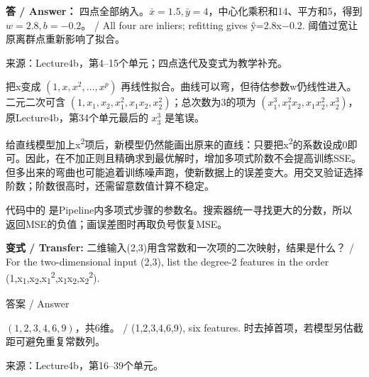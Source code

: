 \textbf{答 / Answer：} 四点全部纳入。\(\bar x=1.5,\bar y=4\)，中心化乘积和14、平方和5，得到\(w=2.8,b=-0.2\)。 / All four are inliers; refitting gives ŷ=2.8x\ensuremath{-}0.2. 阈值过宽让原离群点重新影响了拟合。


来源：Lecture4b，第4–15个单元；四点迭代及变式为教学补充。





把x变成 \((1,x,x^2,\ldots,x^p)\) 再线性拟合。曲线可以弯，但待估参数w仍线性进入。二元二次可含 \((1,x_1,x_2,x_1^2,x_1x_2,x_2^2)\)；总次数为3的项为 \((x_1^3,x_1^2x_2,x_1x_2^2,x_2^3)\)，原Lecture4b，第34个单元最后的 \(x_3^3\) 是笔误。


给直线模型加上x\textsuperscript{2}项后，新模型仍然能画出原来的直线：只要把x\textsuperscript{2}的系数设成0即可。因此，在不加正则且精确求到最优解时，增加多项式阶数不会提高训练SSE。但多出来的弯曲也可能追着训练噪声跑，使新数据上的误差变大。用交叉验证选择阶数；阶数很高时，还需留意数值计算不稳定。


代码中的  是Pipeline内多项式步骤的参数名。搜索器统一寻找更大的分数，所以  返回MSE的负值；画误差图时再取负号恢复MSE。


\textbf{变式 / Transfer:} 二维输入(2,3)用含常数和一次项的二次映射，结果是什么？ / For the two-dimensional input (2,3), list the degree-2 features in the order (1,x\textsubscript{1},x\textsubscript{2},x\textsubscript{1}\textsuperscript{2},x\textsubscript{1}x\textsubscript{2},x\textsubscript{2}\textsuperscript{2}).



\begin{StudySolution}{答案 / Answer}


\((1,2,3,4,6,9)\)，共6维。 / (1,2,3,4,6,9), six features. 时去掉首项，若模型另估截距可避免重复常数列。


\end{StudySolution}


来源：Lecture4b，第16–39个单元。








